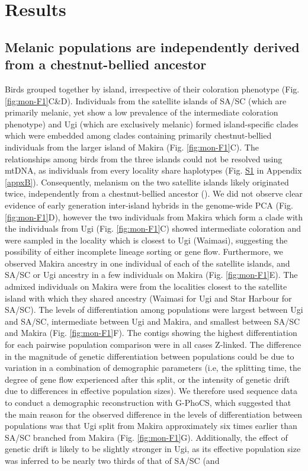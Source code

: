 \section{Results}

\subsection{Melanic populations are independently derived from a chestnut-bellied ancestor}
Birds grouped together by island, irrespective of their coloration phenotype (Fig. \ref{fig:mon-F1}C\&D). Individuals from the satellite islands of \ac{SA/SC} (which are primarily melanic, yet show a low prevalence of the intermediate coloration phenotype) and Ugi (which are exclusively melanic) formed island-specific clades which were embedded among clades containing primarily chestnut-bellied individuals from the larger island of Makira (Fig. \ref{fig:mon-F1}C). The relationships among birds from the three islands could not be resolved using mtDNA, as individuals from every locality share haplotypes (Fig. \href{https://journals.plos.org/PLOSGENETICS/article?id=10.1371/journal.pgen.1010474#sec017}{S1} in Appendix \ref{appxB}). Consequently, melanism on the two satellite islands likely originated twice, independently from a chestnut-bellied ancestor (\cite{uy2016mutations,cooper2017genomic}). We did not observe clear evidence of early generation inter-island hybrids in the genome-wide \acs{PCA} (Fig. \ref{fig:mon-F1}D), however the two individuals from Makira which form a clade with the individuals from Ugi (Fig. \ref{fig:mon-F1}C) showed intermediate coloration and were sampled in the locality which is closest to Ugi (Waimasi), suggesting the possibility of either incomplete lineage sorting or gene flow. Furthermore, we observed Makira ancestry in one individual of each of the satellite islands, and \ac{SA/SC} or Ugi ancestry in a few individuals on Makira (Fig. \ref{fig:mon-F1}E). The admixed individuals on Makira were from the localities closest to the satellite island with which they shared ancestry (Waimasi for Ugi and Star Harbour for \ac{SA/SC}). The levels of differentiation among populations were largest between Ugi and \ac{SA/SC}, intermediate between Ugi and Makira, and smallest between \ac{SA/SC} and Makira (Fig. \ref{fig:mon-F1}F). The contigs showing the highest differentiation for each pairwise population comparison were in all cases Z-linked. The difference in the magnitude of genetic differentiation between populations could be due to variation in a combination of demographic parameters (i.e, the splitting time, the degree of gene flow experienced after this split, or the intensity of genetic drift due to differences in effective population sizes). We therefore used sequence data to conduct a demographic reconstruction with G-PhoCS, which suggested that the main reason for the observed difference in the levels of differentiation between populations was that Ugi split from Makira approximately six times earlier than \ac{SA/SC} branched from Makira (Fig. \ref{fig:mon-F1}G). Additionally, the effect of genetic drift is likely to be slightly stronger in Ugi, as its effective population size was inferred to be nearly two thirds of that of \ac{SA/SC} (and 